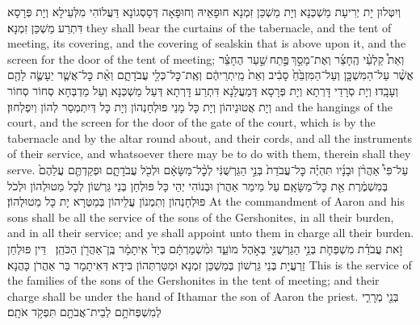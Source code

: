 {וְיִטְּלוּן יָת יְרִיעָת מַשְׁכְּנָא וְיָת מַשְׁכַּן זִמְנָא חוּפָאֵיהּ וְחוּפָאָה דְּסָסְגוֹנָא דַּעֲלוֹהִי מִלְּעֵילָא וְיָת פְּרָסָא דִּתְרַע מַשְׁכַּן זִמְנָא׃}
{they shall bear the curtains of the tabernacle, and the tent of meeting, its covering, and the covering of sealskin that is above upon it, and the screen for the door of the tent of meeting;}{}
{וְאֵת֩ קַלְעֵ֨י הֶֽחָצֵ֜ר וְאֶת־מָסַ֣ךְ \legarmeh  פֶּ֣תַח \legarmeh  שַׁ֣עַר הֶחָצֵ֗ר אֲשֶׁ֨ר עַל־הַמִּשְׁכָּ֤ן וְעַל־הַמִּזְבֵּ֙חַ֙ סָבִ֔יב וְאֵת֙ מֵֽיתְרֵיהֶ֔ם וְאֶֽת־כׇּל־כְּלֵ֖י עֲבֹדָתָ֑ם וְאֵ֨ת כׇּל־אֲשֶׁ֧ר יֵעָשֶׂ֛ה לָהֶ֖ם וְעָבָֽדוּ׃
}
{וְיָת סְרָדֵי דָּרְתָא וְיָת פְּרָסָא דְּמַעֲלַנָא דִּתְרַע דָּרְתָא דְּעַל מַשְׁכְּנָא וְעַל מַדְבְּחָא סְחוֹר סְחוֹר וְיָת אֲטוּנֵיהוֹן וְיָת כָּל מָנֵי פּוּלְחָנְהוֹן וְיָת כָּל דְּיִתְמְסַר לְהוֹן וְיִפְלְחוּן׃}
{and the hangings of the court, and the screen for the door of the gate of the court, which is by the tabernacle and by the altar round about, and their cords, and all the instruments of their service, and whatsoever there may be to do with them, therein shall they serve.}{}
{עַל־פִּי֩ אַהֲרֹ֨ן וּבָנָ֜יו תִּהְיֶ֗ה כׇּל־עֲבֹדַת֙ בְּנֵ֣י הַגֵּרְשֻׁנִּ֔י לְכׇ֨ל־מַשָּׂאָ֔ם וּלְכֹ֖ל עֲבֹדָתָ֑ם וּפְקַדְתֶּ֤ם עֲלֵהֶם֙ בְּמִשְׁמֶ֔רֶת אֵ֖ת כׇּל־מַשָּׂאָֽם׃
}
{עַל מֵימַר אַהֲרֹן וּבְנוֹהִי יְהֵי כָּל פּוּלְחַן בְּנֵי גֵּרְשׁוֹן לְכָל מַטוּלְהוֹן וּלְכֹל פּוּלְחָנְהוֹן וְתִמְנוֹן עֲלֵיהוֹן בְּמַטְּרָא יָת כָּל מַטוּלְהוֹן׃}
{At the commandment of Aaron and his sons shall be all the service of the sons of the Gershonites, in all their burden, and in all their service; and ye shall appoint unto them in charge all their burden.}{}
{זֹ֣את עֲבֹדַ֗ת מִשְׁפְּחֹ֛ת בְּנֵ֥י הַגֵּרְשֻׁנִּ֖י בְּאֹ֣הֶל מוֹעֵ֑ד וּמִ֨שְׁמַרְתָּ֔ם בְּיַד֙ אִֽיתָמָ֔ר בֶּֽן־אַהֲרֹ֖ן הַכֹּהֵֽן׃ \setuma }
{דֵּין פּוּלְחַן זַרְעֲיָת בְּנֵי גֵּרְשׁוֹן בְּמַשְׁכַּן זִמְנָא וּמַטַּרְתְּהוֹן בִּידָא דְּאִיתָמָר בַּר אַהֲרֹן כָּהֲנָא׃}
{This is the service of the families of the sons of the Gershonites in the tent of meeting; and their charge shall be under the hand of Ithamar the son of Aaron the priest.}{}
{בְּנֵ֖י מְרָרִ֑י לְמִשְׁפְּחֹתָ֥ם לְבֵית־אֲבֹתָ֖ם תִּפְקֹ֥ד אֹתָֽם׃}

